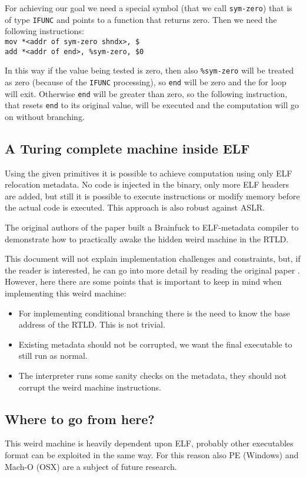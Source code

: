 \documentclass[11pt,twoside,a4paper]{article}
\begin{document}
For achieving our goal we need a special symbol (that we call \texttt{sym-zero}) that is of type \texttt{IFUNC} and points to a function that returns zero. Then we need the following instructions:\\
\texttt{mov *<addr of sym-zero shndx>, \$<test val>} \\
\texttt{add *<addr of end>, \%sym-zero, \$0}

In this way if the value being tested is zero, then also \texttt{\%sym-zero} will be treated as zero (because of the \texttt{IFUNC} processing), so \texttt{end} will be zero and the for loop will exit. Otherwise \texttt{end} will be greater than zero, so the following instruction, that resets \texttt{end} to its original value, will be executed and the computation will go on without branching.


\subsection{A Turing complete machine inside ELF}

Using the given primitives it is possible to achieve computation using only ELF relocation metadata. No code is injected in the binary, only more ELF headers are added, but still it is possible to execute instructions or modify memory before the actual code is executed. This approach is also robust against ASLR.

The original authors of the paper built a Brainfuck to ELF-metadata compiler to demonstrate how to practically awake the hidden weird machine in the RTLD.

This document will not explain implementation challenges and constraints, but, if the reader is interested, he can go into more detail by reading the original paper \cite{elf_machine}. However, here there are some points that is important to keep in mind when implementing this weird machine:
\begin{itemize}
\item For implementing conditional branching there is the need to know the base address of the RTLD. This is not trivial.
\item Existing metadata should not be corrupted, we want the final executable to still run as normal.
\item The interpreter runs some sanity checks on the metadata, they should not corrupt the weird machine instructions.
\end{itemize}


\subsection{Where to go from here?}
This weird machine is heavily dependent upon ELF, probably other executables format can be exploited in the same way. For this reason also PE (Windows) and Mach-O (OSX) are a subject of future research.
\end{document}
